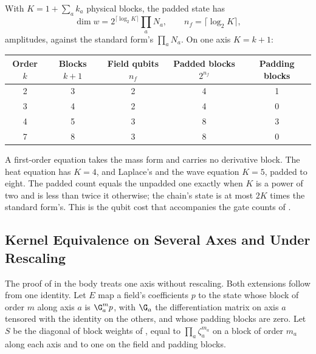 With $K=1+\sum_ak_a$ physical blocks, the padded state has
\begin{equation}
    \dim w = 2^{\lceil\log_2K\rceil}\prod_aN_a,
    \qquad
    n_f=\lceil\log_2K\rceil ,
    \label{eq:app-padded-count}
\end{equation}
amplitudes, against the standard form's $\prod_aN_a$. On one axis $K=k+1$:

\begin{center}
\begin{tabular}{ccccc}
\toprule
Order $k$ & Blocks $k+1$ & Field qubits $n_f$ & Padded blocks $2^{n_f}$ & Padding blocks \\
\midrule
2 & 3 & 2 & 4 & 1 \\
3 & 4 & 2 & 4 & 0 \\
4 & 5 & 3 & 8 & 3 \\
7 & 8 & 3 & 8 & 0 \\
\bottomrule
\end{tabular}
\end{center}

A first-order equation takes the mass form and carries no derivative block. The heat equation has $K=4$, and Laplace's and the wave equation $K=5$, padded to eight. The padded count equals the unpadded one exactly when $K$ is a power of two and is less than twice it otherwise; the chain's state is at most $2K$ times the standard form's. This is the qubit cost that accompanies the gate counts of .

\subsection{Kernel Equivalence on Several Axes and Under Rescaling}
\label{app:proof-kernel-equivalence}

The proof of  in the body treats one axis without rescaling. Both extensions follow from one identity. Let $E$ map a field's coefficients $p$ to the state whose block of order $m$ along axis $a$ is $\G_a^mp$, with $\G_a$ the differentiation matrix on axis $a$ tensored with the identity on the others, and whose padding blocks are zero. Let $S$ be the diagonal of block weights of , equal to $\prod_a\zeta_a^{m_a}$ on a block of order $m_a$ along each axis and to one on the field and padding blocks.

